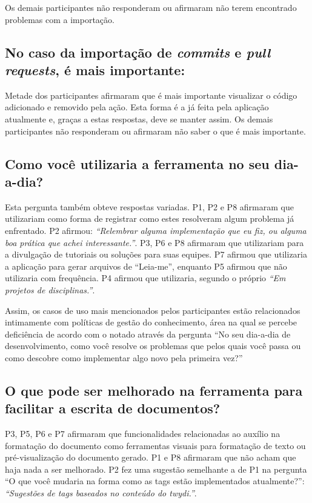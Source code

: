 Os demais participantes não responderam ou afirmaram não terem encontrado problemas com a importação.

\subsection{No caso da importação de \textit{commits} e \textit{pull requests}, é mais importante: }

Metade dos participantes afirmaram que é mais importante visualizar o código adicionado e removido pela ação. Esta forma é a já feita pela aplicação atualmente e, graças a estas respostas, deve se manter assim. Os demais participantes não responderam ou afirmaram não saber o que é mais importante.

\subsection{Como você utilizaria a ferramenta no seu dia-a-dia?}

Esta pergunta também obteve respostas variadas. P1, P2 e P8 afirmaram que utilizariam como forma de registrar como estes resolveram algum problema já enfrentado. P2 afirmou: \textit{``Relembrar alguma implementação que eu fiz, ou alguma boa prática que achei interessante.''}. P3, P6 e P8 afirmaram que utilizariam para a divulgação de tutoriais ou soluções para suas equipes. P7 afirmou que utilizaria a aplicação para gerar arquivos de ``Leia-me'', enquanto P5 afirmou que não utilizaria com frequência. P4 afirmou que utilizaria, segundo o próprio \textit{``Em projetos de disciplinas.''}.

Assim, os casos de uso mais mencionados pelos participantes estão relacionados intimamente com políticas de gestão do conhecimento, área na qual se percebe deficiência de acordo com o notado através da pergunta ``No seu dia-a-dia de desenvolvimento, como você resolve os problemas que pelos quais você passa ou como descobre como implementar algo novo pela primeira vez?''

\subsection{O que pode ser melhorado na ferramenta para facilitar a escrita de documentos?}

P3, P5, P6 e P7 afirmaram que funcionalidades relacionadas ao auxílio na formatação do documento como ferramentas visuais para formatação de texto ou pré-visualização do documento gerado. P1 e P8 afirmaram que não acham que haja nada a ser melhorado. P2 fez uma sugestão semelhante a de P1 na pergunta ``O que você mudaria na forma como as tags estão implementados atualmente?'': \textit{``Sugestões de tags baseados no conteúdo do twydi.''}.

